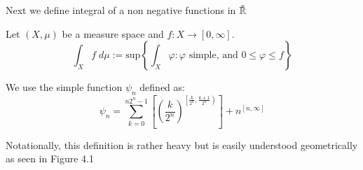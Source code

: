 Next we define integral of a non negative functions in $\bar{\mathbb{R}}$

\begin{definition}
Let $(X,\mu)$ be a measure space and $f: X \to [0,\infty]$. 
\begin{equation}
\int_X \! f \; d\mu := \text{sup} \left\{ \int_X \varphi : \varphi \text{ simple, and } 0 \leq \varphi \leq f \right\}
\end{equation}
\end{definition}

We use the simple function $\psi_n$ defined as:
\begin{equation}
\psi_n = \sum_{k=0}^{n2^n -1} \left[ \left(\frac{k}{2^n}\right)^{\left[ \frac{k}{2^n}, \frac{k+1}{2^n} \right)} \right] + n^{[n,\infty]}
\end{equation}

Notationally, this definition is rather heavy but is easily understood geometrically as seen in Figure 4.1

